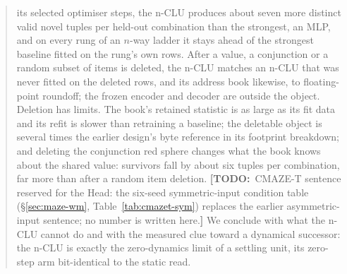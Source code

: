 \documentclass{article} %
\newcommand{\TODO}[1]{{\color{orange}\textbf{[TODO:}~#1\textbf{]}}}
\begin{document}
\begin{abstract}
its selected optimiser steps, the n-CLU produces about seven more distinct
valid novel tuples per held-out combination than the strongest, an MLP, and on every rung of an $n$-way ladder
it stays ahead of the strongest baseline fitted on the rung's own rows.
After a value, a conjunction or a random subset of items is deleted, the n-CLU matches an n-CLU that
was never fitted on the deleted rows, and its address book likewise, to floating-point roundoff; the frozen encoder and decoder are outside the
object. Deletion has limits. The book's retained statistic is %
as large as its fit data and its refit is slower than retraining a baseline; the deletable object is several times %
the earlier design's byte reference in its footprint breakdown; and deleting the conjunction red sphere %
changes what the book knows about the shared value: survivors fall by about six tuples per %
combination, far more than after a random item deletion. %
\TODO{CMAZE-T sentence reserved for the Head: the six-seed symmetric-input condition table
(\S\ref{sec:maze-wm}, Table~\ref{tab:cmazet-sym}) replaces the earlier asymmetric-input sentence; no
number is written here.}
We conclude with what the n-CLU cannot do and with the measured clue toward a
dynamical successor: the n-CLU is exactly the zero-dynamics limit of a settling unit, its zero-step arm bit-identical to the static read. %
\end{abstract}
\end{document}
